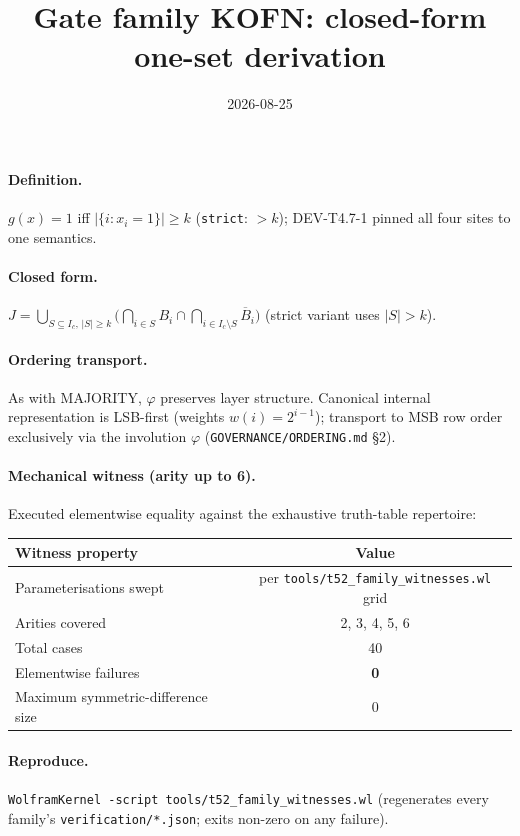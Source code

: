 \documentclass{article}
\title{Gate family KOFN: closed-form one-set derivation}
\date{2026-08-25}
\begin{document}
\maketitle

\paragraph{Definition.} $g(x)=1$ iff $|\{i:x_i=1\}|\ge k$ (\texttt{strict}: $>k$); DEV-T4.7-1 pinned all four sites to one semantics.

\paragraph{Closed form.} $J=\bigcup_{S\subseteq I_c,\,|S|\ge k}\bigl(\bigcap_{i\in S}B_i\cap\bigcap_{i\in I_c\setminus S}\overline{B}_i\bigr)$ (strict variant uses $|S|>k$).

\paragraph{Ordering transport.} As with MAJORITY, $\varphi$ preserves layer structure.
Canonical internal representation is LSB-first (weights $w(i)=2^{i-1}$);
transport to MSB row order exclusively via the involution $\varphi$
(\texttt{GOVERNANCE/ORDERING.md} \S2).

\paragraph{Mechanical witness (arity up to 6).} Executed elementwise equality
against the exhaustive truth-table repertoire:
\begin{center}
\begin{tabular}{lc}
\hline
Witness property & Value \\ \hline
Parameterisations swept & per \texttt{tools/t52_family_witnesses.wl} grid \\
Arities covered & 2, 3, 4, 5, 6 \\
Total cases & 40 \\
Elementwise failures & \textbf{0} \\
Maximum symmetric-difference size & 0 \\ \hline
\end{tabular}
\end{center}

\paragraph{Reproduce.} \texttt{WolframKernel -script tools/t52_family_witnesses.wl}
(regenerates every family's \texttt{verification/*.json}; exits non-zero on any failure).
\end{document}

